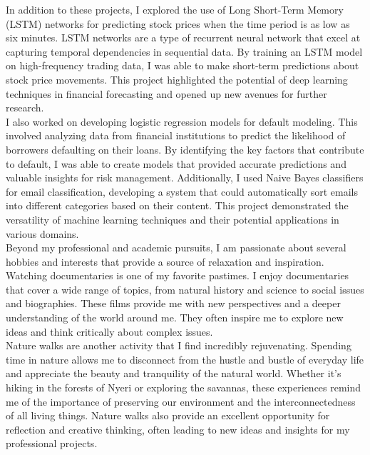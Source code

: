 \documentclass[12pt,a4paper,sans,english]{report}
\begin{document}
\noindent In addition to these projects, I explored the use of Long Short-Term Memory (LSTM) networks for predicting stock prices when the time period is as low as six minutes. LSTM networks are a type of recurrent neural network that excel at capturing temporal dependencies in sequential data. By training an LSTM model on high-frequency trading data, I was able to make short-term predictions about stock price movements. This project highlighted the potential of deep learning techniques in financial forecasting and opened up new avenues for further research.\\

\noindent I also worked on developing logistic regression models for default modeling. This involved analyzing data from financial institutions to predict the likelihood of borrowers defaulting on their loans. By identifying the key factors that contribute to default, I was able to create models that provided accurate predictions and valuable insights for risk management. Additionally, I used Naive Bayes classifiers for email classification, developing a system that could automatically sort emails into different categories based on their content. This project demonstrated the versatility of machine learning techniques and their potential applications in various domains.\\

\noindent Beyond my professional and academic pursuits, I am passionate about several hobbies and interests that provide a source of relaxation and inspiration. Watching documentaries is one of my favorite pastimes. I enjoy documentaries that cover a wide range of topics, from natural history and science to social issues and biographies. These films provide me with new perspectives and a deeper understanding of the world around me. They often inspire me to explore new ideas and think critically about complex issues.\\

\noindent Nature walks are another activity that I find incredibly rejuvenating. Spending time in nature allows me to disconnect from the hustle and bustle of everyday life and appreciate the beauty and tranquility of the natural world. Whether it’s hiking in the forests of Nyeri or exploring the savannas, these experiences remind me of the importance of preserving our environment and the interconnectedness of all living things. Nature walks also provide an excellent opportunity for reflection and creative thinking, often leading to new ideas and insights for my professional projects.\\
\end{document}
